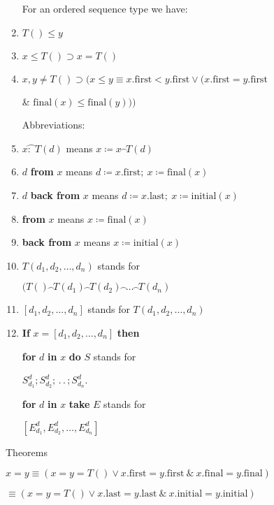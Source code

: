 \begin{enumerate}[wide, nosep, label=(\arabic*)]
	\noindent
	For an ordered sequence type we have:

	\item $T() \leqslant y$
	\item $x \leqslant T() \supset x = T()$
	\item $x, y \neq T() \supset (x \leqslant y \equiv x.\text{first} < y.\text{first} \lor (x.\text{first} = y.\text{first}$
	
	\tabto*{12.6em}\& $\text{final}(x) \leqslant \text{final}(y)))$

	\noindent	
	Abbreviations:

	\item  $x\wideparen{\text{:} \ \ }T(d)$ \tabto*{11em} means $x \coloneq x\wideparen{\ \ }T(d)$
	\item $d$ \textbf{from} $x$\tabto*{11em} means $d\coloneq x.\text{first};\ x\coloneq \text{final}(x)$
	\item $d$ \textbf{back from} $x$\tabto*{11em} means $d\coloneq x.\text{last};\ x\coloneq \text{initial}(x)$
	\item \textbf{from} $x$\tabto*{11em} means $x\coloneq \text{final}(x)$
	\item \textbf{back from} $x$\tabto*{11em} means $x\coloneq \text{initial}(x)$
	\item $T(d_1, d_2, \dots, d_n)$ stands for
	
	\qquad\quad $(T()\wideparen{\ \ }T(d_1)\wideparen{\ \ }T(d_2)\wideparen{\ \ }\dots\wideparen{\ \ }T(d_n)$
	
	\item $[d_1, d_2, \dots, d_n]$ stands for $T(d_1, d_2, \dots, d_n)$
	\item \textbf{If} $x = [d_1, d_2, \dots, d_n]$ \textbf{then}
	
	\qquad \quad \textbf{for} $d$ \textbf{in} $x$ \textbf{do} $S$ stands for

	\qquad \qquad \qquad $S_{d_1}^d; S_{d_2}^d; \,.\,.\,; S_{d_n}^d$.


	\qquad \quad \textbf{for} $d$ \textbf{in} $x$ \textbf{take} $E$ stands for
	
	\qquad \qquad \qquad $[E_{d_1}^d, E_{d_2}^d, \dots, E_{d_n}^d]$

\end{enumerate}

\noindent
Theorems

	\quad $x = y \equiv (x = y = T() \lor x.\text{first} = y.\text{first}\ \&\ x.\text{final} = y.\text{final})$

	\tabto*{4.9em} $\equiv (x = y = T() \lor x.\text{last} = y.\text{last}\ \&\ x.\text{initial} = y.\text{initial})$
	\bigskip

